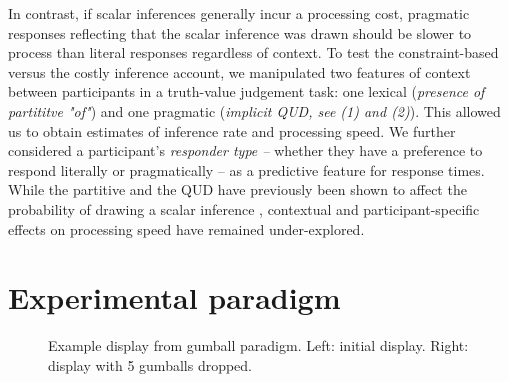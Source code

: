 \documentclass[10pt,letterpaper]{article}
\newcommand{\lk}[1]{\textcolor{Blue}{[lk: #1]}}
\begin{document}
 In contrast, if scalar inferences generally incur a processing cost, pragmatic responses reflecting that the scalar inference was drawn should be slower to process than literal responses regardless of context. To test the constraint-based versus the costly inference account, we manipulated two features of context between participants in a truth-value judgement task: one lexical (\textit{presence of partititve "of"}) and one pragmatic (\textit{implicit QUD, see (1) and (2)}). This allowed us to obtain estimates of inference rate and processing speed. We further considered a participant’s \textit{responder type  --} whether they have a preference to respond literally or pragmatically -- as a predictive feature for response times. While the partitive and the QUD have previously been shown to affect the probability of drawing a scalar inference \cite{Zondervan2010,Degen2015,DegenGoodman2014,DegenTanenhaus2015}, contextual and participant-specific effects on processing speed have remained under-explored.


\section{Experimental paradigm}

\begin{figure}
\caption{Example display from gumball paradigm. Left: initial display. Right: display with 5 gumballs dropped.  \label{fig:gumball-paradigm}}
\end{figure}
\end{document}
